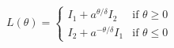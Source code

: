 \documentclass[preview]{standalone}
\begin{document}
\begin{align*}
L(\theta) = \begin{cases}I_1 + a^{\theta/\delta}I_2 & \text{if } \theta \geq 0 \\I_2 + a^{-\theta/\delta}I_1 & \text{if } \theta \leq 0\end{cases}
\end{align*}
\end{document}
